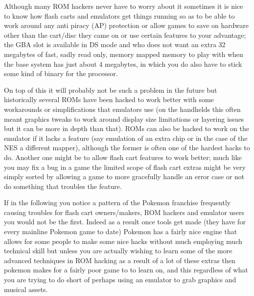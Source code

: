 \documentclass[
]{book}
\begin{document}
Although many ROM hackers never have to worry about it sometimes it is nice to know how flash carts and emulators get things running so as to be able to work around any anti piracy (AP) protection or allow games to save on hardware other than the cart/disc they came on or use certain features to your advantage; the GBA slot is available in DS mode and who does not want an extra 32 megabytes of fast, sadly read only, memory mapped memory to play with when the base system has just about 4 megabytes, in which you do also have to stick some kind of binary for the processor.

On top of this it will probably not be such a problem in the future but historically several ROMs have been hacked to work better with some workarounds or simplifications that emulators use (on the handhelds this often meant graphics tweaks to work around display size limitations or layering issues but it can be more in depth than that). ROMs can also be hacked to work on the emulator if it lacks a feature (say emulation of an extra chip or in the case of the NES a different mapper), although the former is often one of the hardest hacks to do. Another one might be to allow flash cart features to work better; much like you may fix a bug in a game the limited scope of flash cart extras might be very simply sorted by allowing a game to more gracefully handle an error case or not do something that troubles the feature.

If in the following you notice a pattern of the Pokemon franchise frequently causing troubles for flash cart owners/makers, ROM hackers and emulator users you would not be the first. Indeed as a result once tools get made (they have for every mainline Pokemon game to date) Pokemon has a fairly nice engine that allows for some people to make some nice hacks without much employing much technical skill but unless you are actually wishing to learn some of the more advanced techniques in ROM hacking as a result of a lot of these extras then pokemon makes for a fairly poor game to to learn on, and this regardless of what you are trying to do short of perhaps using an emulator to grab graphics and musical assets.
\end{document}
